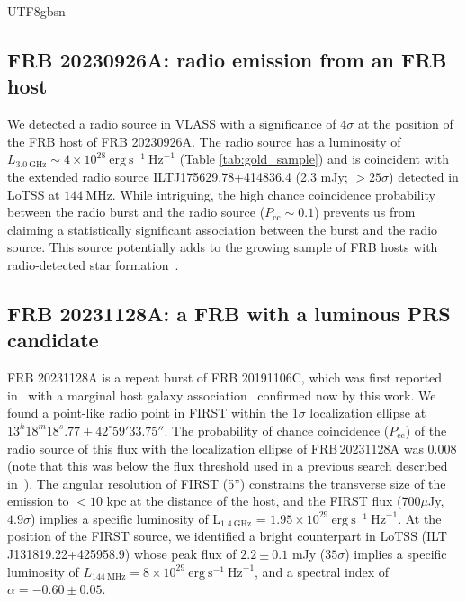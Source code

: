 \documentclass[twocolumn,linenumbers]{aastex631}
\begin{document}
\begin{CJK*}{UTF8}{gbsn}
\subsection{FRB 20230926A: radio emission from an FRB host}\label{sec:FRB20230926A}
We detected a radio source in VLASS with a significance of $4\sigma$ at the position of the FRB host of FRB 20230926A. The radio source has a luminosity of $L_\mathrm{3.0~\mathrm{GHz}} \sim 4\times10^{28}~\mathrm{erg~s}^{-1}~\mathrm{Hz}^{-1}$ (Table \ref{tab:gold_sample}) and is coincident with the extended radio source ILTJ175629.78+414836.4 (2.3 mJy; $>25\sigma$) detected in LoTSS at $144~\mathrm{MHz}$. While intriguing, the high chance coincidence probability between the radio burst and the radio source ($P_\mathrm{cc} \sim 0.1$) prevents us from claiming a statistically significant association between the burst and the radio source. This source potentially adds to the growing sample of FRB hosts with radio-detected star formation~\citep[e.g.,][]{dong2024mapping}.

\subsection{FRB 20231128A: a FRB with a luminous PRS candidate}\label{sec:FRB20231128A}
FRB 20231128A is a repeat burst of FRB 20191106C, which was first reported in~\citet{collaboration2023chime} with a marginal host galaxy association~\citep{Ibik2024host} confirmed now by this work. We found a point-like radio point in FIRST within the 1$\sigma$ localization ellipse at $13^h18^m18^s.77 +42^\circ59'33.75''$. The probability of chance coincidence ($P_\mathrm{cc}$) of the radio source of this flux with the localization ellipse of FRB\,20231128A was 0.008 (note that this was below the flux threshold used in a previous search described in~\citet{Ibik2024prs}). The angular resolution of FIRST (5'') constrains the transverse size of the emission to $<10$ kpc at the distance of the host, and the FIRST flux (700$\mu$Jy, $4.9\sigma$) implies a specific luminosity of L$_{1.4 ~\mathrm{GHz}}$ = $1.95\times10^{29}~\mathrm{erg~s}^{-1}~\mathrm{Hz}^{-1}$. At the position of the FIRST source, we identified a bright counterpart in LoTSS (ILT J131819.22+425958.9) whose peak flux of $2.2 \pm 0.1$ mJy ($35\sigma$) implies a specific luminosity of $L_{\mathrm{144~\mathrm{MHz}}} = 8\times10^{29}~\mathrm{erg~s}^{-1}~\mathrm{Hz}^{-1}$, and a spectral index of $\alpha = -0.60 \pm 0.05$. 


\end{CJK*}
\end{document}
